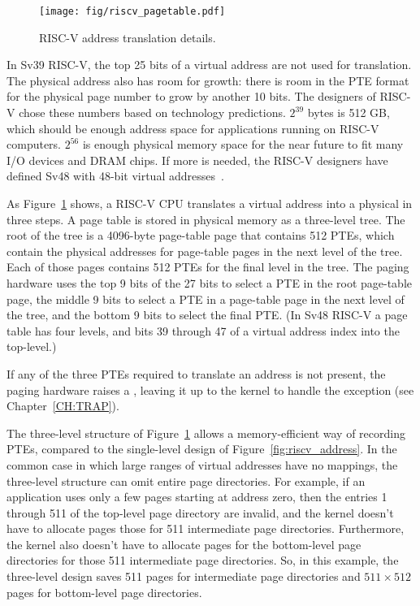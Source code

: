\begin{figure}[t]
\center
\texttt{[image: fig/riscv\_pagetable.pdf]}
\caption{RISC-V address translation details.}
\label{fig:riscv_pagetable}
\end{figure}

In Sv39 RISC-V, the top 25 bits of a virtual address are not used for
translation. The physical address also has room for growth: there is
room in the PTE format for the physical page number to grow by another
10 bits.  The designers of RISC-V chose these numbers based on
technology predictions.  $2^{39}$ bytes is 512 GB, which should be
enough address space for applications running on RISC-V
computers. $2^{56}$ is enough physical memory space for the near
future to fit many I/O devices and DRAM chips. If
more is needed, the RISC-V designers have defined Sv48 with 48-bit
virtual addresses~\cite{riscv:priv}.

As 
Figure~\ref{fig:riscv_pagetable} shows,
a RISC-V CPU translates a virtual address into a physical in
three steps.  A page table is stored
in physical memory as a three-level tree.
The root of the tree is a
4096-byte page-table page that contains 512 PTEs, which contain the physical
addresses for page-table pages in the next level of the tree.  Each of those
pages contains 512 PTEs for the final level in the tree.  The paging
hardware uses the top 9 bits of the 27 bits to select a PTE in the
root page-table page, the middle 9 bits to select a PTE in a page-table page in the
next level of the
tree, and the bottom 9 bits to select the final PTE.
(In Sv48 RISC-V a page table has four levels, and bits 39 through 47
of a virtual address index into the top-level.)

If any of the three PTEs required to translate an address
is not present, the paging hardware raises a , leaving it up
to the kernel to handle the exception (see Chapter~\ref{CH:TRAP}).

The three-level structure of Figure~\ref{fig:riscv_pagetable} allows a
memory-efficient way of recording PTEs, compared to the single-level
design of Figure~\ref{fig:riscv_address}.  In the common case in which
large ranges of virtual addresses have no mappings, the three-level
structure can omit entire page directories.  For example, if an
application uses only a few pages starting at address zero, then the
entries 1 through 511 of the top-level page directory are invalid, and
the kernel doesn't have to allocate pages those for 511 intermediate
page directories.  Furthermore, the kernel also doesn't have to
allocate pages for the bottom-level page directories for those 511
intermediate page directories. So, in this example, the three-level
design saves 511 pages for intermediate page directories and
$511\times512$ pages for bottom-level page directories.

